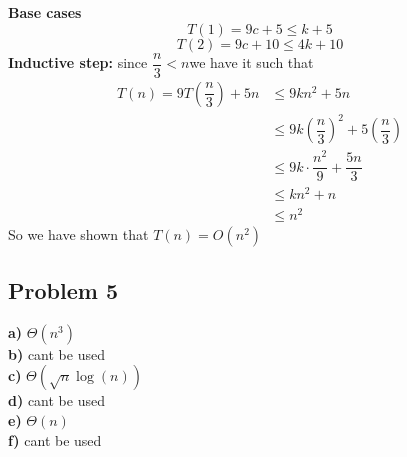 \documentclass[12pt]{article}
\begin{document}
\textbf{Base cases}\\
\[ T(1) = 9c + 5 \leq k + 5 \]
\[ T(2) = 9c + 10 \leq 4k + 10 \]
\textbf{Inductive step:} since $\dfrac{n}{3} < n$we have it such that
\begin{align*}
T(n) = 9T(\dfrac{n}{3}) +5n &\leq 9kn^2 +5n\\
&\leq 9k \left( \dfrac{n}{3} \right)^2 + 5(\dfrac{n}{3})\\
&\leq 9k \cdot \dfrac{n^2}{9} + \dfrac{5n}{3}\\
&\leq kn^2 + n\\
&\leq n^2
\end{align*}
So we have shown that $T(n) = O(n^2)$
\subsection*{Problem 5}
\textbf{a)} $\Theta(n^3)$\\
\textbf{b)} cant be used\\
\textbf{c)} $\Theta(\sqrt{n}\log (n))$\\
\textbf{d)} cant be used\\
\textbf{e)} $\Theta(n)$\\
\textbf{f)} cant be used
\end{document}
